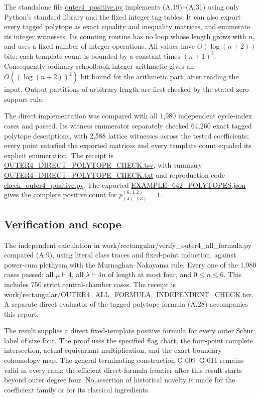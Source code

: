 \documentclass[
  10pt,
]{article}
\begin{document}
The standalone file \url{outer4_positive.py} implements (A.19)--(A.31)
using only Python's standard library and the fixed integer tag tables.
It can also export every tagged polytope as exact equality and
inequality matrices, and enumerate its integer witnesses. Its counting
routine has no loop whose length grows with \(n\), and uses a fixed
number of integer operations. All values have \(O(\log(n+2))\) bits:
each template count is bounded by a constant times \((n+1)^3\).
Consequently ordinary schoolbook integer arithmetic gives an
\(O((\log(n+2))^2)\) bit bound for the arithmetic part, after reading
the input. Output partitions of arbitrary length are first checked by
the stated zero-support rule.

The direct implementation was compared with all 1,980 independent
cycle-index cases and passed. Its witness enumerator separately checked
64,260 exact tagged polytope descriptions, with 2,588 lattice witnesses
across the tested coefficients; every point satisfied the exported
matrices and every template count equaled its explicit enumeration. The
receipt is \url{OUTER4_DIRECT_POLYTOPE_CHECK.tsv}, with summary
\url{OUTER4_DIRECT_POLYTOPE_CHECK.txt} and reproduction code
\url{check_outer4_positive.py}. The exported
\url{EXAMPLE_642_POLYTOPES.json} gives the complete positive count for
\(p_{(4),(3)}^{(6,4,2)}=1\).

\subsection{Verification and scope}\label{verification-and-scope}

The independent calculation in
work/rectangular/verify\_outer4\_all\_formula.py compared (A.9), using
literal class traces and fixed-point induction, against power-sum
plethysm with the Murnaghan--Nakayama rule. Every one of the 1,980 cases
passed: all \(\mu\vdash4\), all \(\lambda\vdash4n\) of length at most
four, and \(0\le n\le6\). This includes 750 strict central-chamber
cases. The receipt is
work/rectangular/OUTER4\_ALL\_FORMULA\_INDEPENDENT\_CHECK.tsv. A
separate direct evaluator of the tagged polytope formula (A.28)
accompanies this report.

The result supplies a direct fixed-template positive formula for every
outer Schur label of size four. The proof uses the specified flag chart,
the four-point complete intersection, actual equivariant multiplication,
and the exact boundary cohomology map. The general terminating
construction G-009--G-011 remains valid in every rank; the efficient
direct-formula frontier after this result starts beyond outer degree
four. No assertion of historical novelty is made for the coefficient
family or for its classical ingredients.
\end{document}
